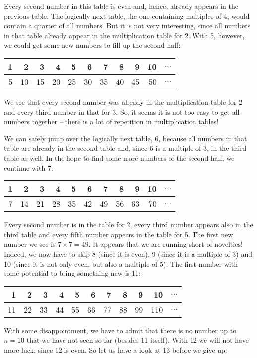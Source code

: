 \documentclass{scrreprt}
\begin{document}
Every second number in this table is even
and, hence, already appears in the previous table.
The logically next table, the one containing multiples of 4,
would contain a quarter of all numbers.
But it is not very interesting, since all numbers in that table
already appear in the multiplication table for 2. 
With 5, however, we could get some new numbers to fill
up the second half:

\begin{tabular}{r|r|r|r|r|r|r|r|r|r|c}
1 & 2  &  3 & 4  & 5  & 6  & 7  & 8  & 9  & 10 & $\dots$ \\\hline
5 & 10 & 15 & 20 & 25 & 30 & 35 & 40 & 45 & 50 & $\dots$
\end{tabular}

We see that every second number was already in the 
multiplication table for 2 and every third number in that for 3.
So, it seems it is not too easy to get all numbers together --
there is a lot of repetition in multiplication tables!

We can safely jump over the logically next table, 6, 
because all numbers in that table are already in the second table
and, since 6 is a multiple of 3, in the third table as well.
In the hope to find some more numbers of the second half,
we continue with 7:

\begin{tabular}{r|r|r|r|r|r|r|r|r|r|c}
1 & 2  &  3 & 4  & 5  & 6  & 7  & 8  & 9  & 10 & $\dots$ \\\hline
7 & 14 & 21 & 28 & 35 & 42 & 49 & 56 & 63 & 70 & $\dots$
\end{tabular}

Every second number is in the table for 2, every third number appears
also in the third table and every fifth number appears in the table
for 5. The first new number we see is $7 \times 7 = 49$.
It appears that we are running short of novelties!
Indeed, we now have to skip 8 (since it is even), 
9 (since it is a multiple of 3) and 10 (since it is not only even,
but also a multiple of 5). 
The first number with some potential to bring something new
is 11:

\begin{tabular}{r|r|r|r|r|r|r|r|r|r|c}
1  & 2  &  3 & 4  & 5  & 6  & 7  & 8  & 9  & 10  & $\dots$ \\\hline
11 & 22 & 33 & 44 & 55 & 66 & 77 & 88 & 99 & 110 & $\dots$
\end{tabular}

With some disappointment, we have to admit that there is no 
number up to $n=10$ that we have not seen so far (besides 11 itself).
With 12 we will not have more luck, since 12 is even.
So let us have a look at 13 before we give up:
\end{document}
